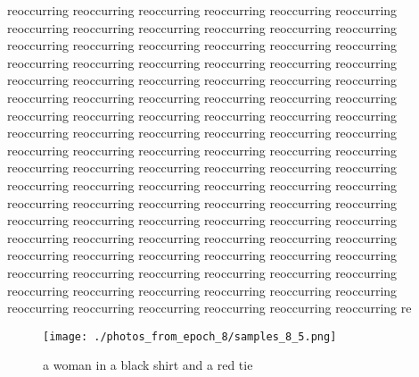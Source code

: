 \documentclass{article}%
\begin{document}
reoccurring reoccurring reoccurring reoccurring reoccurring reoccurring reoccurring reoccurring reoccurring reoccurring reoccurring reoccurring reoccurring reoccurring reoccurring reoccurring reoccurring reoccurring reoccurring reoccurring reoccurring reoccurring reoccurring reoccurring reoccurring reoccurring reoccurring reoccurring reoccurring reoccurring reoccurring reoccurring reoccurring reoccurring reoccurring reoccurring reoccurring reoccurring reoccurring reoccurring reoccurring reoccurring reoccurring reoccurring reoccurring reoccurring reoccurring reoccurring reoccurring reoccurring reoccurring reoccurring reoccurring reoccurring reoccurring reoccurring reoccurring reoccurring reoccurring reoccurring reoccurring reoccurring reoccurring reoccurring reoccurring reoccurring reoccurring reoccurring reoccurring reoccurring reoccurring reoccurring reoccurring reoccurring reoccurring reoccurring reoccurring reoccurring reoccurring reoccurring reoccurring reoccurring reoccurring reoccurring reoccurring reoccurring reoccurring reoccurring reoccurring reoccurring reoccurring reoccurring reoccurring reoccurring reoccurring reoccurring reoccurring reoccurring reoccurring reoccurring reoccurring reoccurring reoccurring reoccurring reoccurring reoccurring reoccurring reoccurring re

%


\begin{figure}[h!]%
\centering%
\texttt{[image: ./photos\_from\_epoch\_8/samples\_8\_5.png]}%
\caption{a woman in a black shirt and a red tie}%
\end{figure}

%
\end{document}
